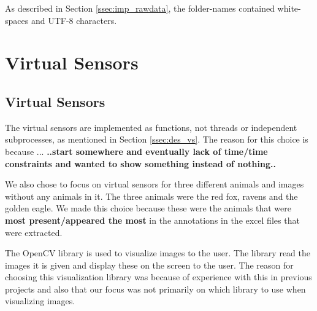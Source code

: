 \documentclass[USenglish]{uit-thesis}
\begin{document}
As described in Section \ref{ssec:imp_rawdata}, the folder-names contained white-spaces and UTF-8 characters. 

\section{Virtual Sensors} \label{sec:imp_virsens}
\subsection{Virtual Sensors} %

The virtual sensors are implemented as functions, not threads or independent subprocesses, as mentioned in Section \ref{ssec:des_vs}. The reason for this choice is because ... \textbf{..start somewhere and eventually lack of time/time constraints and wanted to show something instead of nothing..}



We also chose to focus on virtual sensors for three different animals and images without any animals in it. The three animals were the red fox, ravens and the golden eagle. We made this choice because these were the animals that were \textbf{most present/appeared the most} in the annotations in the excel files that were extracted.



The OpenCV library is used to visualize images to the user. The library read the images it is given and display these on the screen to the user. The reason for choosing this visualization library was because of experience with this in previous projects and also that our focus was not primarily on which library to use when visualizing images.
\end{document}
